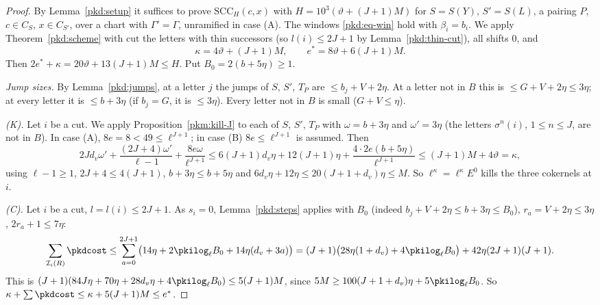\documentclass[10pt]{amsart}
\theoremstyle{definition}
\theoremstyle{remark}
\begin{document}
\begin{proof}
By Lemma~\ref{pkd:setup} it suffices to prove $\mathrm{SCC}_H(c,x)$ with $H=10^3(\vartheta+(J+1)M)$
for $S=S(Y)$, $S'=S(L)$, a pairing $P$, $c\in C_S$, $x\in C_{S'}$, over a chart with $\Gamma'=\Gamma$,
unramified in case (A). The windows \eqref{pkd:eq-win} hold with $\beta_i=b_i$. We apply
Theorem~\ref{pkd:scheme} with $\mathrm{cut}$ the letters with thin successors (so $l(i)\le2J+1$ by
Lemma~\ref{pkd:thin-cut}), all shifts $0$, and
\[
\kappa=4\vartheta+(J+1)M,\qquad e^*=8\vartheta+6(J+1)M .
\]
Then $2e^*+\kappa=20\vartheta+13(J+1)M\le H$. Put $B_0=2(b+5\eta)\ge1$.

\emph{Jump sizes.} By Lemma~\ref{pkd:jumps}, at a letter $j$ the jumps of $S$, $S'$, $T_P$ are $\le
b_j+V+2\eta$. At a letter not in $B$ this is $\le G+V+2\eta\le3\eta$; at every letter it is
$\le b+3\eta$ (if $b_j=G$, it is $\le3\eta$). Every letter not in $B$ is small ($G+V\le\eta$).

\emph{(K).} Let $i$ be a cut. We apply Proposition~\ref{pkm:kill-J} to each of $S$, $S'$, $T_P$ with
$\omega=b+3\eta$ and $\omega'=3\eta$ (the letters $\sigma^n(i)$, $1\le n\le J$, are not in $B$). In
case (A), $8e=8<49\le\ell^{J+1}$; in case (B) $8e\le\ell^{J+1}$ is assumed. Then
\[
2Jd_v\omega'+\frac{(2J+4)\omega'}{\ell-1}+\frac{8e\omega}{\ell^{J+1}}
\le6(J+1)d_v\eta+12(J+1)\eta+\frac{4\cdot2e(b+5\eta)}{\ell^{J+1}}
\le(J+1)M+4\vartheta=\kappa,
\]
using $\ell-1\ge1$, $2J+4\le4(J+1)$, $b+3\eta\le b+5\eta$ and $6d_v\eta+12\eta\le20(J+1+d_v)\eta\le M$.
So $\ell^\kappa=\ell^\kappa E^0$ kills the three cokernels at $i$.

\emph{(C).} Let $i$ be a cut, $l=l(i)\le2J+1$. As $s_i=0$, Lemma~\ref{pkd:steps} applies with $B_0$
(indeed $b_j+V+2\eta\le b+3\eta\le B_0$), $r_a=V+2\eta\le3\eta$, $2r_a+1\le7\eta$:
\[
\sum_{\mathcal I_i(R)}\pkdcost\le\sum_{a=0}^{2J+1}\bigl(14\eta+2\pkilog_\ell B_0+14\eta(d_v+3a)\bigr)
=(J+1)\bigl(28\eta(1+d_v)+4\pkilog_\ell B_0\bigr)+42\eta(2J+1)(J+1).
\]
This is $(J+1)(84J\eta+70\eta+28d_v\eta+4\pkilog_\ell B_0)\le5(J+1)M$, since
$5M\ge100(J+1+d_v)\eta+5\pkilog_\ell B_0$. So $\kappa+\sum\pkdcost\le\kappa+5(J+1)M\le e^*$.


\end{proof}
\end{document}
